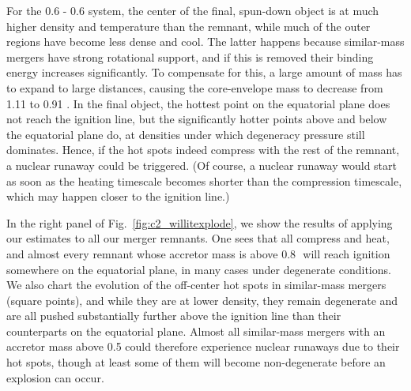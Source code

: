 For the 0.6 - 0.6 {\Msun} system, the center of the final, spun-down object is at much higher density and temperature than the remnant, while much of the outer regions have become less dense and cool.  The latter happens because similar-mass mergers have strong rotational support, and if this is removed their binding energy increases significantly.  To compensate for this, a large amount of mass has to expand to large distances, causing the core-envelope mass to decrease from 1.11 {\Msun} to 0.91 {\Msun}.  In the final object, the hottest point on the equatorial plane does not reach the ignition line, but the significantly hotter points above and below the equatorial plane do, at densities under which degeneracy pressure still dominates.  Hence, if the hot spots indeed compress with the rest of the remnant, a nuclear runaway could be triggered.  (Of course, a nuclear runaway would start as soon as the heating timescale becomes shorter than the compression timescale, which may happen closer to the ignition line.)


In the right panel of Fig.~\ref{fig:c2_willitexplode}, we show the results of applying our estimates to all our merger remnants.  One sees that all compress and heat, and almost every remnant whose accretor mass is above 0.8\,\Msun\ will reach ignition somewhere on the equatorial plane, in many cases under degenerate conditions.  We also chart the evolution of the off-center hot spots in similar-mass mergers (square points), and while they are at lower density, they remain degenerate and are all pushed substantially further above the ignition line than their counterparts on the equatorial plane.  Almost all similar-mass mergers with an accretor mass above 0.5 {\Msun} could therefore experience nuclear runaways due to their hot spots, though at least some of them will become non-degenerate before an explosion can occur.

